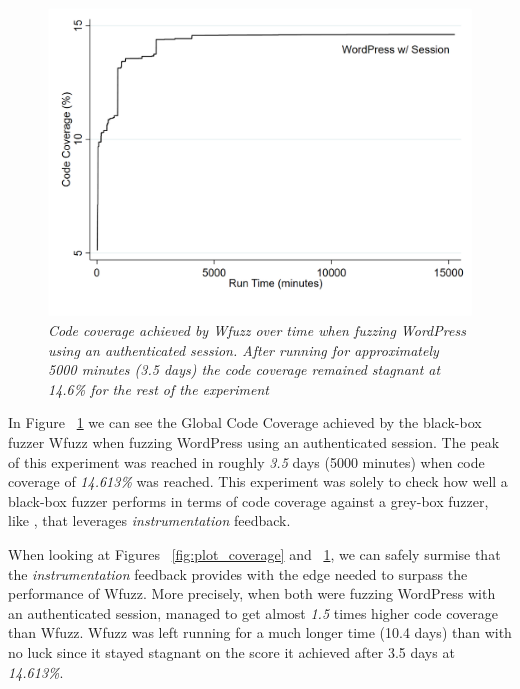 \begin{figure}[!htb]
  \centering \includegraphics[width=\linewidth]{figures/plot_coverage2.pdf}
  \captionsetup{justification=centering} 
  \caption[Accumulated global code coverage using Wfuzz]{\textit{Code coverage achieved by Wfuzz over time when fuzzing WordPress using an authenticated session. After running for approximately 5000 minutes (3.5 days) the code coverage remained stagnant at 14.6\% for the rest of the experiment}}
  \label{fig:plot_coverage2}
\end{figure}

In Figure ~\ref{fig:plot_coverage2} we can see the Global Code Coverage achieved by the black-box fuzzer Wfuzz when fuzzing WordPress using an authenticated session. The peak of this experiment was reached in roughly \emph{3.5} days (5000 minutes) when code coverage of \emph{14.613\%} was reached. This experiment was solely to check how well a black-box fuzzer performs in terms of code coverage against a grey-box fuzzer, like \pname{}, that leverages \emph{instrumentation} feedback. 

When looking at Figures ~\ref{fig:plot_coverage} and ~\ref{fig:plot_coverage2}, we can safely surmise that the \emph{instrumentation} feedback provides \pname{} with the edge needed to surpass the performance of Wfuzz. More precisely, when both were fuzzing WordPress with an authenticated session, \pname{} managed to get almost \emph{1.5} times higher code coverage than Wfuzz. Wfuzz was left running for a much longer time (10.4 days) than \pname{} with no luck since it stayed stagnant on the score it achieved after 3.5 days at \emph{14.613\%}.

